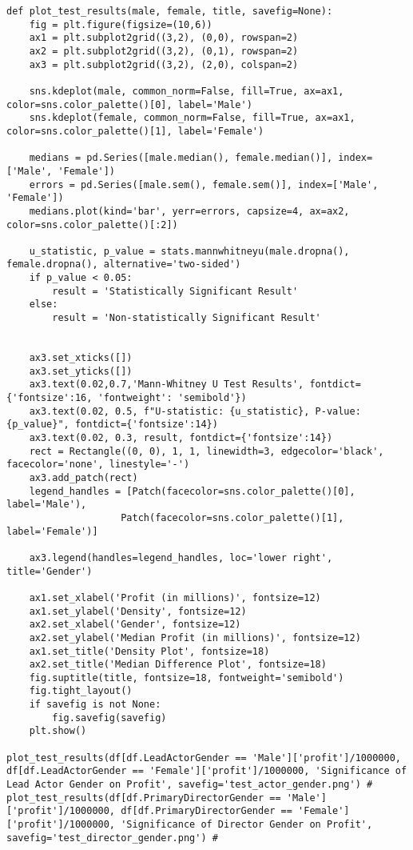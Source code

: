 \begin{lstlisting}
def plot_test_results(male, female, title, savefig=None):
    fig = plt.figure(figsize=(10,6)) 
    ax1 = plt.subplot2grid((3,2), (0,0), rowspan=2)
    ax2 = plt.subplot2grid((3,2), (0,1), rowspan=2)
    ax3 = plt.subplot2grid((3,2), (2,0), colspan=2)
    
    sns.kdeplot(male, common_norm=False, fill=True, ax=ax1, color=sns.color_palette()[0], label='Male')
    sns.kdeplot(female, common_norm=False, fill=True, ax=ax1, color=sns.color_palette()[1], label='Female')
    
    medians = pd.Series([male.median(), female.median()], index=['Male', 'Female'])
    errors = pd.Series([male.sem(), female.sem()], index=['Male', 'Female'])
    medians.plot(kind='bar', yerr=errors, capsize=4, ax=ax2, color=sns.color_palette()[:2])
    
    u_statistic, p_value = stats.mannwhitneyu(male.dropna(), female.dropna(), alternative='two-sided')
    if p_value < 0.05:
        result = 'Statistically Significant Result'
    else:
        result = 'Non-statistically Significant Result'

    
    ax3.set_xticks([])
    ax3.set_yticks([])
    ax3.text(0.02,0.7,'Mann-Whitney U Test Results', fontdict={'fontsize':16, 'fontweight': 'semibold'})
    ax3.text(0.02, 0.5, f"U-statistic: {u_statistic}, P-value: {p_value}", fontdict={'fontsize':14})
    ax3.text(0.02, 0.3, result, fontdict={'fontsize':14})
    rect = Rectangle((0, 0), 1, 1, linewidth=3, edgecolor='black', facecolor='none', linestyle='-')
    ax3.add_patch(rect)
    legend_handles = [Patch(facecolor=sns.color_palette()[0], label='Male'),
                    Patch(facecolor=sns.color_palette()[1], label='Female')]

    ax3.legend(handles=legend_handles, loc='lower right', title='Gender')
    
    ax1.set_xlabel('Profit (in millions)', fontsize=12)
    ax1.set_ylabel('Density', fontsize=12)
    ax2.set_xlabel('Gender', fontsize=12)
    ax2.set_ylabel('Median Profit (in millions)', fontsize=12)
    ax1.set_title('Density Plot', fontsize=18)
    ax2.set_title('Median Difference Plot', fontsize=18)
    fig.suptitle(title, fontsize=18, fontweight='semibold')
    fig.tight_layout()
    if savefig is not None:
        fig.savefig(savefig)
    plt.show()

plot_test_results(df[df.LeadActorGender == 'Male']['profit']/1000000, df[df.LeadActorGender == 'Female']['profit']/1000000, 'Significance of Lead Actor Gender on Profit', savefig='test_actor_gender.png') # 
plot_test_results(df[df.PrimaryDirectorGender == 'Male']['profit']/1000000, df[df.PrimaryDirectorGender == 'Female']['profit']/1000000, 'Significance of Director Gender on Profit', savefig='test_director_gender.png') # 
\end{lstlisting}

